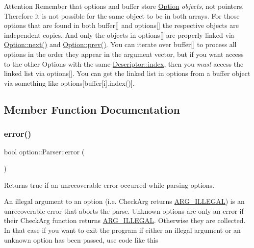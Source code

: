 \begin{DoxyAttention}{Attention}
Remember that {\ttfamily options} and {\ttfamily buffer} store \hyperlink{classoption_1_1_option}{Option} {\itshape objects}, not pointers. Therefore it is not possible for the same object to be in both arrays. For those options that are found in both {\ttfamily buffer}\mbox{[}\mbox{]} and {\ttfamily options}\mbox{[}\mbox{]} the respective objects are independent copies. And only the objects in {\ttfamily options}\mbox{[}\mbox{]} are properly linked via \hyperlink{classoption_1_1_option_a59ae9aed505f4d410633bb36478a32be}{Option\+::next()} and \hyperlink{classoption_1_1_option_a4d12001a91b0b35cf47437d0c60d2b52}{Option\+::prev()}. You can iterate over {\ttfamily buffer}\mbox{[}\mbox{]} to process all options in the order they appear in the argument vector, but if you want access to the other Options with the same \hyperlink{structoption_1_1_descriptor_a1fee8ac44f529c99ac2b1149b4c391b1}{Descriptor\+::index}, then you {\itshape must} access the linked list via {\ttfamily options}\mbox{[}\mbox{]}. You can get the linked list in options from a buffer object via something like {\ttfamily options}\mbox{[}buffer\mbox{[}i\mbox{]}.index()\mbox{]}. 
\end{DoxyAttention}


\subsection{Member Function Documentation}
\mbox{\label{classoption_1_1_parser_a2caa149140067b4d13e4d7a104bb3090}} 
\subsubsection{\texorpdfstring{error()}{error()}}
{\footnotesize\ttfamily bool option\+::\+Parser\+::error (\begin{DoxyParamCaption}{ }\end{DoxyParamCaption})\hspace{0.3cm}{\ttfamily [inline]}}



Returns {\ttfamily true} if an unrecoverable error occurred while parsing options. 

An illegal argument to an option (i.\+e. Check\+Arg returns \hyperlink{namespaceoption_aee8c76a07877335762631491e7a5a1a9a9528e32563b795bd2930b12d0a5e382d}{A\+R\+G\+\_\+\+I\+L\+L\+E\+G\+AL}) is an unrecoverable error that aborts the parse. Unknown options are only an error if their Check\+Arg function returns \hyperlink{namespaceoption_aee8c76a07877335762631491e7a5a1a9a9528e32563b795bd2930b12d0a5e382d}{A\+R\+G\+\_\+\+I\+L\+L\+E\+G\+AL}. Otherwise they are collected. In that case if you want to exit the program if either an illegal argument or an unknown option has been passed, use code like this


